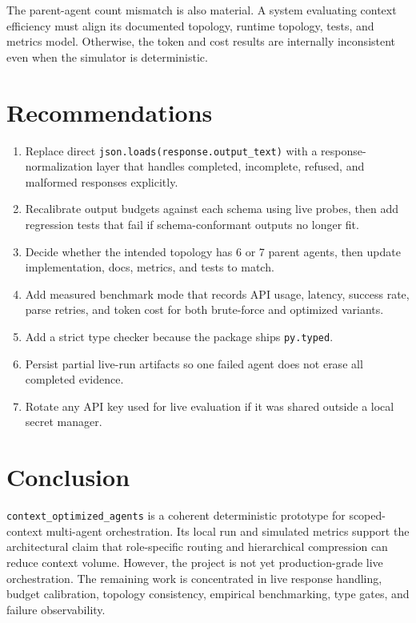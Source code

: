 \documentclass[11pt]{article}
\begin{document}
The parent-agent count mismatch is also material. A system evaluating context efficiency must align its documented topology, runtime topology, tests, and metrics model. Otherwise, the token and cost results are internally inconsistent even when the simulator is deterministic.

\section{Recommendations}

\begin{enumerate}[leftmargin=*]
  \item Replace direct \texttt{json.loads(response.output\_text)} with a response-normalization layer that handles completed, incomplete, refused, and malformed responses explicitly.
  \item Recalibrate output budgets against each schema using live probes, then add regression tests that fail if schema-conformant outputs no longer fit.
  \item Decide whether the intended topology has 6 or 7 parent agents, then update implementation, docs, metrics, and tests to match.
  \item Add measured benchmark mode that records API usage, latency, success rate, parse retries, and token cost for both brute-force and optimized variants.
  \item Add a strict type checker because the package ships \texttt{py.typed}.
  \item Persist partial live-run artifacts so one failed agent does not erase all completed evidence.
  \item Rotate any API key used for live evaluation if it was shared outside a local secret manager.
\end{enumerate}

\section{Conclusion}

\texttt{context\_optimized\_agents} is a coherent deterministic prototype for scoped-context multi-agent orchestration. Its local run and simulated metrics support the architectural claim that role-specific routing and hierarchical compression can reduce context volume. However, the project is not yet production-grade live orchestration. The remaining work is concentrated in live response handling, budget calibration, topology consistency, empirical benchmarking, type gates, and failure observability.
\end{document}
